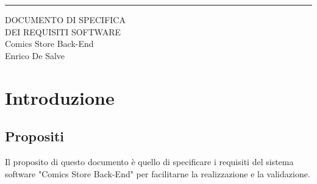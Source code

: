 \documentclass{scrreprt}
\date{Maggio 2022}
\begin{document}
\begin{flushright}
    \rule{14cm}{5pt}\vskip1cm
    \begin{bfseries}
        \Huge{DOCUMENTO DI SPECIFICA\\ DEI REQUISITI SOFTWARE}\\
        \vspace{1.9cm}
        Comics Store Back-End\\
        \vspace{1.9cm}
        Enrico De Salve\\
        \vspace{1.9cm}
    \end{bfseries}
\end{flushright}

\tableofcontents

\chapter{Introduzione}

\section{Propositi}
Il proposito di questo documento è quello di specificare i requisiti del sistema software
"Comics Store Back-End" per facilitarne la realizzazione e la validazione.
\end{document}
